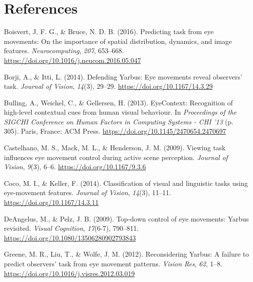 \documentclass[
  english,
  man,floatsintext]{apa6}
\begin{document}
\newpage

\hypertarget{references}{%
\section{References}\label{references}}

\begingroup
\setlength{\parindent}{-0.5in}
\setlength{\leftskip}{0.5in}

\hypertarget{refs}{}
\leavevmode\hypertarget{ref-boisvertPredictingTaskEye2016}{}%
Boisvert, J. F. G., \& Bruce, N. D. B. (2016). Predicting task from eye movements: On the importance of spatial distribution, dynamics, and image features. \emph{Neurocomputing}, \emph{207}, 653--668. \url{https://doi.org/10.1016/j.neucom.2016.05.047}

\leavevmode\hypertarget{ref-borjiDefendingYarbusEye2014a}{}%
Borji, A., \& Itti, L. (2014). Defending Yarbus: Eye movements reveal observers' task. \emph{Journal of Vision}, \emph{14}(3), 29--29. \url{https://doi.org/10.1167/14.3.29}

\leavevmode\hypertarget{ref-bullingEyeContextRecognitionHighlevel2013}{}%
Bulling, A., Weichel, C., \& Gellersen, H. (2013). EyeContext: Recognition of high-level contextual cues from human visual behaviour. In \emph{Proceedings of the SIGCHI Conference on Human Factors in Computing Systems - CHI '13} (p. 305). Paris, France: ACM Press. \url{https://doi.org/10.1145/2470654.2470697}

\leavevmode\hypertarget{ref-castelhanoViewingTaskInfluences2009}{}%
Castelhano, M. S., Mack, M. L., \& Henderson, J. M. (2009). Viewing task influences eye movement control during active scene perception. \emph{Journal of Vision}, \emph{9}(3), 6--6. \url{https://doi.org/10.1167/9.3.6}

\leavevmode\hypertarget{ref-cocoClassificationVisualLinguistic2014}{}%
Coco, M. I., \& Keller, F. (2014). Classification of visual and linguistic tasks using eye-movement features. \emph{Journal of Vision}, \emph{14}(3), 11--11. \url{https://doi.org/10.1167/14.3.11}

\leavevmode\hypertarget{ref-deangelusTopdownControlEye2009}{}%
DeAngelus, M., \& Pelz, J. B. (2009). Top-down control of eye movements: Yarbus revisited. \emph{Visual Cognition}, \emph{17}(6-7), 790--811. \url{https://doi.org/10.1080/13506280902793843}

\leavevmode\hypertarget{ref-greeneReconsideringYarbusFailure2012a}{}%
Greene, M. R., Liu, T., \& Wolfe, J. M. (2012). Reconsidering Yarbus: A failure to predict observers' task from eye movement patterns. \emph{Vision Res}, \emph{62}, 1--8. \url{https://doi.org/10.1016/j.visres.2012.03.019}
\end{document}

